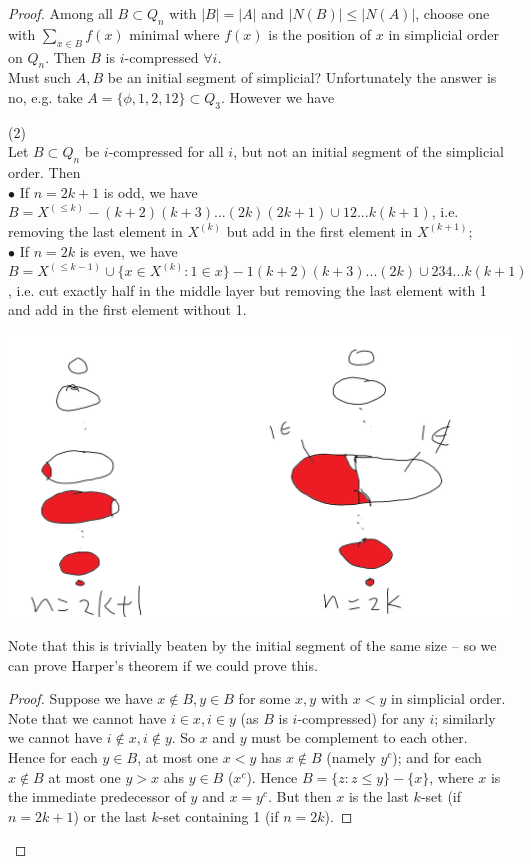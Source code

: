 \documentclass[a4paper]{article}
\begin{document}
\begin{thm}
\begin{proof}
        Among all $B \subset Q_n$ with $|B| = |A|$ and $|N(B)| \leq |N(A)|$, choose one with $\sum_{x \in B} f(x)$ minimal where $f(x)$ is the position of $x$ in simplicial order on $Q_n$. Then $B$ is $i$-compressed $\forall i$.\\
        Must such $A,B$ be an initial segment of simplicial? Unfortunately the answer is no, e.g. take $A=\{\phi,1,2,12\} \subset Q_3$.
        However we have 
        \begin{lemma} (2)\\
            Let $B \subset Q_n$ be $i$-compressed for all $i$, but not an initial segment of the simplicial order. Then\\
            $\bullet$ If $n=2k+1$ is odd, we have $B=X^{(\leq k)} - (k+2)(k+3)...(2k)(2k+1) \cup 12...k(k+1)$, i.e. removing the last element in $X^{(k)}$ but add in the first element in $X^{(k+1)}$;\\
            $\bullet$ If $n=2k$ is even, we have $B=X^{(\leq k-1)} \cup \{x \in X^{(k)}: 1 \in x\} - 1(k+2)(k+3)...(2k) \cup 234...k(k+1)$, i.e. cut exactly half in the middle layer but removing the last element with 1 and add in the first element without 1.

            \includegraphics[scale=0.5]{image/Comb_02.png}

            Note that this is trivially beaten by the initial segment of the same size -- so we can prove Harper's theorem if we could prove this.
            \begin{proof}
                Suppose we have $x \not\in B, y \in B$ for some $x,y$ with $x<y$ in simplicial order. Note that we cannot have $i \in x, i \in y$ (as $B$ is $i$-compressed) for any $i$; similarly we cannot have $i \not\in x, i \not\in y$. So $x$ and $y$ must be complement to each other.\\
                Hence for each $y \in B$, at most one $x<y$ has $x \not\in B$ (namely $y^c$); and for each $x\not\in B$ at most one $y>x$ ahs $y \in B$ ($x^c$). Hence $B=\{z:z \leq y\} - \{x\}$, where $x$ is the immediate predecessor of $y$ and $x=y^c$. But then $x$ is the last $k$-set (if $n=2k+1$) or the last $k$-set containing 1 (if $n=2k$).
            \end{proof}
        \end{lemma}
    \end{proof}
\end{thm}
\end{document}

